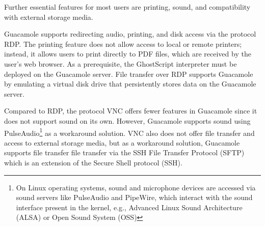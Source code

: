 \documentclass[runningheads]{llncs}
\begin{document}
Further essential features for most users are printing, sound, and compatibility with external storage media.

Guacamole supports redirecting audio, printing, and disk access via the protocol RDP. The printing feature does not allow access to local or remote printers; instead, it allows users to print directly to PDF files, which are received by the user's web browser. As a prerequisite, the GhostScript interpreter must be deployed on the Guacamole server. File transfer over RDP supports Guacamole by emulating a virtual disk drive that persistently stores data on the Guacamole server.~\cite{ApacheGuacamole2024}

Compared to RDP, the protocol VNC offers fewer features in Guacamole since it does not support sound on its own. However, Guacamole supports sound using PulseAudio\footnote{On Linux operating systems, sound and microphone devices are accessed via sound servers like PulseAudio and PipeWire, which interact with the sound interface present in the kernel, e.g., Advanced Linux Sound Architecture (ALSA) or Open Sound System (OSS)} as a workaround solution. VNC also does not offer file transfer and access to external storage media, but as a workaround solution, Guacamole supports file transfer file transfer via the SSH File Transfer Protocol (SFTP) which is an extension of the Secure Shell protocol (SSH).
\end{document}
